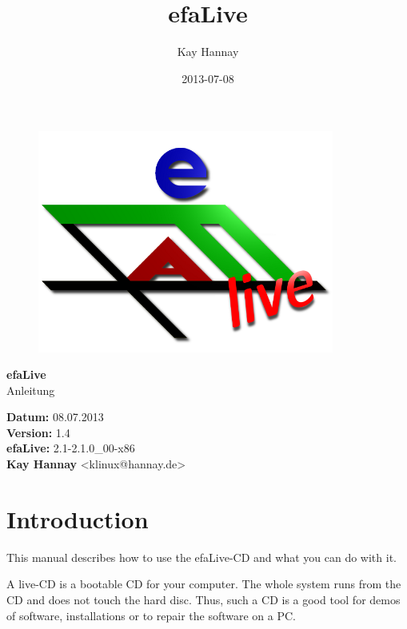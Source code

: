 \documentclass[a4paper,12pt,twoside]{article}
\title{efaLive}
\author{Kay Hannay}
\date{2013-07-08}
\begin{document}

\begin{titlepage}
    \vspace*{1cm}
    \begin{center}
        \begin{figure}
            \centering
            \includegraphics[width=9.745cm,height=7.308cm]{efaLiveen-img/efaLiveen-img1.png}
        \end{figure}
        \Huge
        \textbf{efaLive} \\[0.1cm]
        \LARGE
        Anleitung \\[5cm]
    \end{center}
    \normalsize
    \textbf{Datum:} 08.07.2013 \\
    \textbf{Version:} 1.4 \\
    \textbf{efaLive:} 2.1-2.1.0\_00-x86 \\
    \textbf{Kay Hannay} <klinux@hannay.de> \\
\end{titlepage}


\tableofcontents
\clearpage\setcounter{page}{1}
\section{Introduction}
This manual describes how to use the efaLive-CD and what you can do with
it.

A live-CD is a bootable CD for your computer. The whole system runs from
the CD and does not touch the hard disc. Thus, such a CD is a good tool
for demos of software, installations or to repair the software on a PC.
\end{document}
